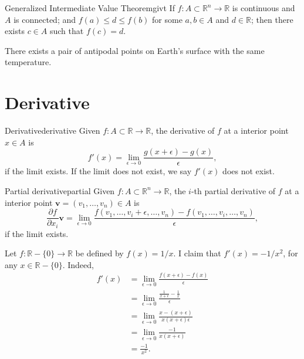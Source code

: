 
\begin{cor}{Generalized Intermediate Value Theorem}{givt}
	If \(f\colon A \subset \mathbb{R}^n \to \mathbb{R}\)  is continuous and \(A\) is connected; and \(f(a) \leq d \leq f(b)\) for some \(a, b \in A\) and \(d \in \mathbb{R}\); then there exists \(c \in A\) such that \(f(c) = d\).
\end{cor}

\begin{cor}{}{}
	There exists a pair of antipodal points on Earth's surface with the same temperature.
\end{cor}

\section{Derivative}

\begin{defn}{Derivative}{derivative}
	Given \(f\colon A \subset \mathbb{R} \to \mathbb{R}\), the derivative of \(f\) at a interior point \(x \in A\) is \[
		f'(x) = \lim_{\epsilon \to 0} \frac{g(x + \epsilon) - g(x)}{\epsilon},
	\] if the limit exists. If the limit does not exist, we say \(f'(x)\) does not exist.
\end{defn}

\begin{defn}{Partial derivative}{partial}
	Given \(f \colon A \subset \mathbb{R}^n \to \mathbb{R}\), the \(i\)-th partial derivative of \(f\) at a interior point \(\mathbf v = (v_1, \dots, v_n) \in A\) is \[
		\frac{\partial f}{\partial x_i} \mathbf v = \lim_{\epsilon \to 0} \frac{f(v_1, \dots, v_i + \epsilon, \dots, v_n) - f(v_1, \dots, v_i, \dots, v_n)}{\epsilon},
	\] if the limit exists.
\end{defn}

\begin{exmp}{}{}
	Let \(f\colon \mathbb{R} - \{0\} \to \mathbb{R}\) be defined by \(f(x) = 1/x\). I claim that \(f'(x) = -1/x^2\), for any \(x \in \mathbb{R} - \{0\}\). Indeed,
	\begin{align*}
		f'(x) &= \lim_{\epsilon \to 0} \frac{f(x+\epsilon) - f(x)}{\epsilon} \\
			  &= \lim_{\epsilon \to 0} \frac{\frac{1}{x + \epsilon} - \frac{1}{x}}{\epsilon} \\
			  &= \lim_{\epsilon \to 0} \frac{x - (x + \epsilon)}{x(x + \epsilon)\epsilon} \\
			  &= \lim_{\epsilon \to 0} \frac{-1}{x(x + \epsilon)} \\
			  &= \frac{-1}{x^2}.
	\end{align*}
\end{exmp}

